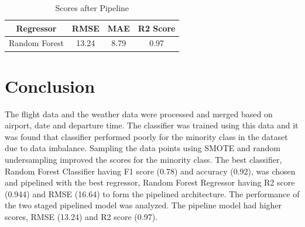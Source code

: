 \documentclass[12pt]{article}
\begin{document}
\begin{table}[H]
    \centering
    \caption{Scores after Pipeline}
    \begin{tabular}{|c|c|c|c|}
    \hline
         \textbf{Regressor} & \textbf{RMSE} & \textbf{MAE} & \textbf{R2 Score} \\
    \hline
        Random Forest & 13.24 & 8.79 & 0.97 \\
    \hline
    \end{tabular}
    \label{tab:Table 9}
\end{table}
\section{Conclusion}
  The flight data and the weather data were processed and merged based on airport, date and departure time. The classifier was trained using this data and it was found that classifier performed poorly for the minority class in the dataset due to data imbalance. Sampling the data points using SMOTE and random undersampling improved the scores for the minority class. The best classifier, Random Forest Classifier having F1 score (0.78) and accuracy (0.92), was chosen and pipelined with the best regressor, Random Forest Regressor having R2 score (0.944) and RMSE (16.64) to form the pipelined architecture. The performance of the two staged pipelined model was analyzed. The pipeline model had higher scores, RMSE (13.24) and R2 score (0.97).
\end{document}
